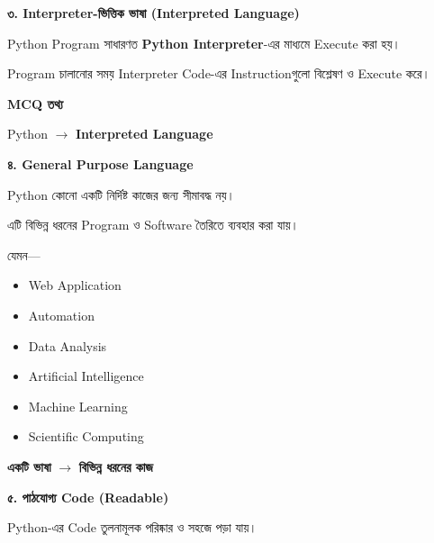 \textbf{\color{darkTeal}৩. Interpreter-ভিত্তিক ভাষা
(Interpreted Language)}

Python Program সাধারণত
\textbf{Python Interpreter}-এর মাধ্যমে Execute করা হয়।

Program চালানোর সময় Interpreter Code-এর Instructionগুলো
বিশ্লেষণ ও Execute করে।

\begin{rememberbox}

\textbf{\color{deepOrange}MCQ তথ্য}

Python
\(\longrightarrow\)
\textbf{Interpreted Language}

\end{rememberbox}


\textbf{\color{darkTeal}৪. General Purpose Language}

Python কোনো একটি নির্দিষ্ট কাজের জন্য সীমাবদ্ধ নয়।

এটি বিভিন্ন ধরনের Program ও Software তৈরিতে ব্যবহার করা যায়।

যেমন—

\begin{itemize}

\item Web Application

\item Automation

\item Data Analysis

\item Artificial Intelligence

\item Machine Learning

\item Scientific Computing

\end{itemize}

\begin{center}

\textbf{একটি ভাষা}
\(\longrightarrow\)
\textbf{বিভিন্ন ধরনের কাজ}

\end{center}


\textbf{\color{darkTeal}৫. পাঠযোগ্য Code (Readable)}

Python-এর Code তুলনামূলক পরিষ্কার ও সহজে পড়া যায়।

